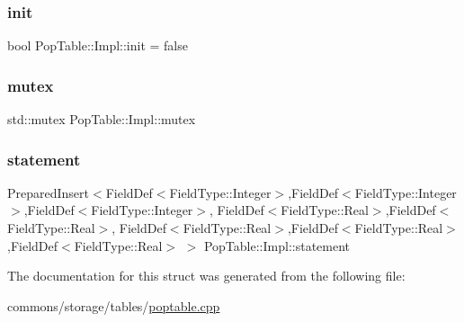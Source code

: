 \subsubsection{\texorpdfstring{init}{init}}
{\footnotesize\ttfamily bool Pop\+Table\+::\+Impl\+::init = false}

\mbox{\label{struct_pop_table_1_1_impl_ae36e4a33bdf225d64e8e77975529958c}} 
\subsubsection{\texorpdfstring{mutex}{mutex}}
{\footnotesize\ttfamily std\+::mutex Pop\+Table\+::\+Impl\+::mutex}

\mbox{\label{struct_pop_table_1_1_impl_a255cd1d29cd934f08260237289aa7377}} 
\subsubsection{\texorpdfstring{statement}{statement}}
{\footnotesize\ttfamily Prepared\+Insert$<$Field\+Def$<$Field\+Type\+::\+Integer$>$,Field\+Def$<$Field\+Type\+::\+Integer$>$,Field\+Def$<$Field\+Type\+::\+Integer$>$, Field\+Def$<$Field\+Type\+::\+Real$>$,Field\+Def$<$Field\+Type\+::\+Real$>$, Field\+Def$<$Field\+Type\+::\+Real$>$,Field\+Def$<$Field\+Type\+::\+Real$>$,Field\+Def$<$Field\+Type\+::\+Real$>$ $>$ Pop\+Table\+::\+Impl\+::statement}



The documentation for this struct was generated from the following file\+:\begin{DoxyCompactItemize}
\item 
commons/storage/tables/\mbox{\hyperlink{poptable_8cpp}{poptable.\+cpp}}\end{DoxyCompactItemize}

